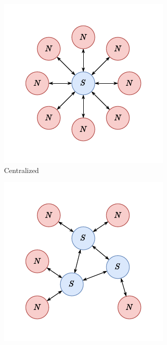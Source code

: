 \begin{figure}
  \centering
  \begin{subfigure}{.25\textwidth}
    \centering
    \includegraphics[width=\textwidth]{figures/topo-centralized}
    \caption{Centralized}
    \label{fig:cids.centralized}
  \end{subfigure}%
  \begin{subfigure}{.25\textwidth}
    \centering
    \includegraphics[width=\textwidth]{figures/topo-decentralized}

\end{subfigure}
\end{figure}
